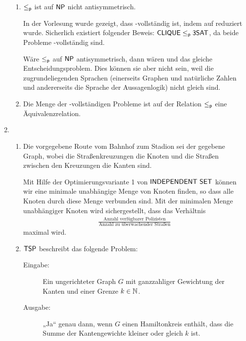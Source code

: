 \begin{enumerate}
\begin{enumerate}
    \item $\leq_{\textsf{p}}$ ist auf $\textsf{NP}$ nicht antisymmetrisch.

      In der Vorlesung wurde gezeigt, dass \CLIQUE{} \NP-vollständig ist, indem
      \DreiSAT{} auf \CLIQUE{} reduziert wurde. Sicherlich existiert folgender
      Beweis: $\textsf{CLIQUE} \leq_{\textsf{p}} \textsf{3SAT}$, da beide Probleme \NP-vollständig sind.

      Wäre $\leq_{\textsf{p}}$ auf $\textsf{NP}$ antisymmetrisch, dann wären \CLIQUE{} und \DreiSAT{}
      das gleiche Entscheidungsproblem. Dies können sie aber nicht sein, weil
      die zugrundeliegenden Sprachen (einerseits Graphen und natürliche Zahlen
      und andererseits die Sprache der Aussagenlogik) nicht gleich sind.

    \item Die Menge der \NP-vollständigen Probleme ist auf der Relation $\leq_{\textsf{p}}$
      eine Äquivalenzrelation.
  \end{enumerate}

  \item
    \begin{enumerate}
      \item Die vorgegebene Route vom Bahnhof zum Stadion sei der gegebene
        Graph, wobei die Straßenkreuzungen die Knoten und die Straßen zwischen
        den Kreuzungen die Kanten sind.

        Mit Hilfe der Optimierungsvariante 1 von $\textsf{INDEPENDENT SET}$ können wir eine minimale
        unabhängige Menge von Knoten finden, so dass alle Knoten durch diese
        Menge verbunden sind. Mit der minimalen Menge unabhängiger Knoten wird
        sichergestellt, dass das Verhältnis
        \begin{align*}
          \frac{\text{Anzahl verfügbarer Polizisten}}{\text{Anzahl zu
          überwachender Straßen}}
        \end{align*}
        maximal wird.

      \pagebreak

      \item $\textsf{TSP}$ beschreibt das folgende Problem:
        \begin{description}
          \item[Eingabe:] Ein ungerichteter Graph $G$ mit ganzzahliger
            Gewichtung der Kanten und einer Grenze $k \in \mathbb{N}$.
          \item[Ausgabe:] „Ja“ genau dann, wenn $G$ einen Hamiltonkreis enthält,
            dass die Summe der Kantengewichte kleiner oder gleich $k$ ist.
        \end{description}


\end{enumerate}
\end{enumerate}
